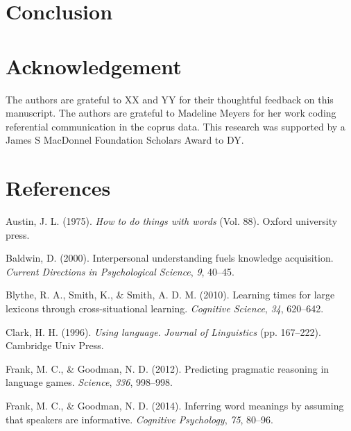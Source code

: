 \documentclass[english,,man,floatsintext]{apa6}
\begin{document}
\hypertarget{conclusion}{%
\section{Conclusion}\label{conclusion}}

\hypertarget{acknowledgement}{%
\section{Acknowledgement}\label{acknowledgement}}

The authors are grateful to XX and YY for their thoughtful feedback on this manuscript. The authors are grateful to Madeline Meyers for her work coding referential communication in the coprus data. This research was supported by a James S MacDonnel Foundation Scholars Award to DY.

\newpage

\hypertarget{references}{%
\section{References}\label{references}}

\setlength{\parindent}{-0.5in}
\setlength{\leftskip}{0.5in}

\hypertarget{refs}{}
\leavevmode\hypertarget{ref-austin1975}{}%
Austin, J. L. (1975). \emph{How to do things with words} (Vol. 88). Oxford university press.

\leavevmode\hypertarget{ref-baldwin2000}{}%
Baldwin, D. (2000). Interpersonal understanding fuels knowledge acquisition. \emph{Current Directions in Psychological Science}, \emph{9}, 40--45.

\leavevmode\hypertarget{ref-blythe2010}{}%
Blythe, R. A., Smith, K., \& Smith, A. D. M. (2010). Learning times for large lexicons through cross-situational learning. \emph{Cognitive Science}, \emph{34}, 620--642.

\leavevmode\hypertarget{ref-clark1996}{}%
Clark, H. H. (1996). \emph{Using language}. \emph{Journal of Linguistics} (pp. 167--222). Cambridge Univ Press.

\leavevmode\hypertarget{ref-frank2012}{}%
Frank, M. C., \& Goodman, N. D. (2012). Predicting pragmatic reasoning in language games. \emph{Science}, \emph{336}, 998--998.

\leavevmode\hypertarget{ref-frank2014}{}%
Frank, M. C., \& Goodman, N. D. (2014). Inferring word meanings by assuming that speakers are informative. \emph{Cognitive Psychology}, \emph{75}, 80--96.
\end{document}
